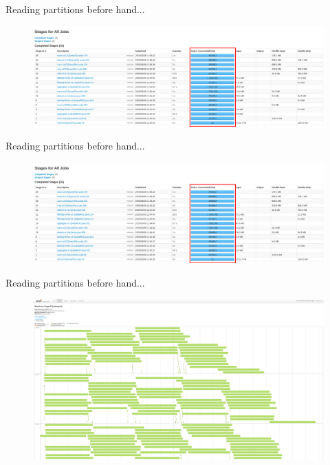 \documentclass{beamer}
\begin{document}
\begin{frame}{Reading partitions before hand...}
    \begin{figure}
        \includegraphics[width=1\textwidth]{figures/Summary}
    \end{figure}
\end{frame}
\begin{frame}{Reading partitions before hand...}
    \centering
    \begin{figure}
        \includegraphics[trim=20cm 0 10cm 4cm, clip, width=1\textwidth]{figures/Summary}
    \end{figure}
\end{frame}

\begin{frame}{Reading partitions before hand...}
    \begin{figure}
        \includegraphics[width=1\textwidth]{figures/Tasks}
    \end{figure}
\end{frame}
\end{document}
